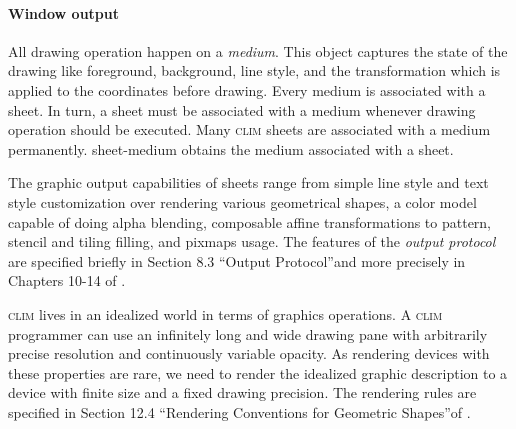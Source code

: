 \documentclass[twocolumn,a4paper]{article}
\newcommand {\concept} [1] {{\sl #1}\index{#1}}
\newcommand {\code}[1]{{\sffamily #1}}
\newcommand {\CLIM}{\textsc{clim}}
\newcommand {\mcclim}{\textsc{McCLIM}}
\begin{document}
\paragraph*{Window output}

All drawing operation happen on a \concept{medium}. This object
captures the state of the drawing like foreground, background, line
style, and the transformation which is applied to the coordinates
before drawing. Every medium is associated with a sheet. In turn, a
sheet must be associated with a medium whenever drawing operation
should be executed. Many \CLIM{} sheets are associated with a medium
permanently. \code{sheet-medium} obtains the medium associated with a
sheet.


The graphic output capabilities of sheets range from simple line style
and text style customization over rendering various geometrical
shapes, a color model capable of doing alpha blending, composable
affine transformations to pattern, stencil and tiling filling, and
pixmaps usage. The features of the \concept{output protocol} are
specified briefly in Section 8.3 ``Output Protocol''and more precisely
in Chapters 10-14 of \cite{clim-spec}.

\CLIM{} lives in an idealized world in terms of graphics operations. A
\CLIM{} programmer can use an infinitely long and wide drawing pane
with arbitrarily precise resolution and continuously variable 
opacity. As rendering devices with these properties are rare,
we need to render the idealized graphic description to a device
with finite size and a fixed drawing precision. The rendering rules
are specified in Section 12.4 ``Rendering Conventions for Geometric
Shapes''of \cite{clim-spec}.
\end{document}
